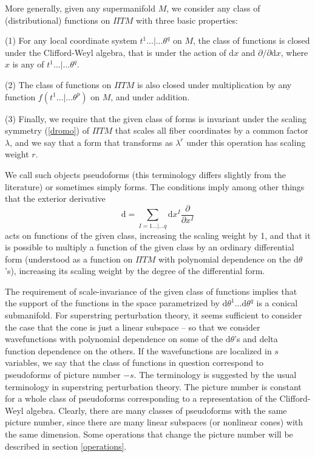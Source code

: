 \documentclass[11pt,a4paper]{article}
\def\d{{\mathrm d}}
\def\Pi{\varPi}
\begin{document}
More generally, given any supermanifold $M$, we consider any class of (distributional) functions on ${\Pi} TM$ with three basic properties:

(1)  For any local coordinate system $t^1\dots|\dots\theta^q$ on $M$, the class of functions is closed under the Clifford-Weyl algebra,
that is under the action of $\d x$ and $\partial/\partial \d x$, where $x$ is any of $t^1\dots|\dots\theta^q$.

(2)  The class of functions on ${\Pi} TM$ is also closed under multiplication by any function $f(t^1\dots|\dots\theta^p)$ on $M$, and under addition.

(3) Finally, we require that the given class of forms is invariant under the scaling symmetry (\ref{dromo}) of ${\Pi} TM$ that scales all fiber coordinates
by a common factor $\lambda$, and we say that a form that transforms as $\lambda^r$
under this operation  has scaling weight $r$.  

We call such objects pseudoforms  (this terminology differs slightly from the literature) or sometimes simply forms.
The conditions imply among other things that the exterior derivative \begin{equation}\label{gelb}
\d=\sum_{I=1\dots | \dots q} \d x^I\frac{\partial}{\partial x^I}  \end{equation}
 acts on functions of the given class, increasing the scaling weight by 1, and that it is possible
to multiply a function of the given class by an ordinary differential form (understood as a function on ${\Pi} TM$  with polynomial dependence on the $\d\theta$'s), increasing
its scaling weight by the degree of the differential form.

The requirement of scale-invariance of the given class of functions
implies that the support of the functions in
the space parametrized by $\d\theta^1\dots\d\theta^q$ is a conical submanifold.   For superstring perturbation theory, it seems sufficient to consider
the case that the cone is just a linear subspace -- so that we consider wavefunctions with polynomial dependence on some of the $\d\theta$'s and delta
function dependence on the others.  
If the wavefunctions are localized in $s$ variables, 
we say that 
the class of functions in question correspond to pseudoforms of  picture number $-s$.  The terminology is suggested by the usual terminology in superstring perturbation
theory.  The picture number is constant for a whole class of pseudoforms corresponding to a representation of the Clifford-Weyl algebra. 
Clearly, there are many classes of pseudoforms with the same picture number, since there are
many linear subspaces (or nonlinear cones) with the same dimension.  Some operations that change the picture number will be described in section \ref{operations}. 
\end{document}
